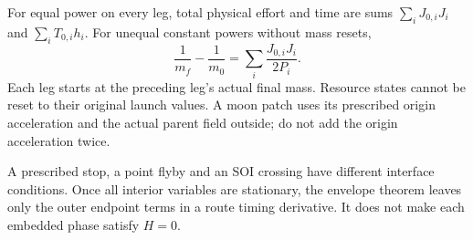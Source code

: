 For equal power on every leg, total physical effort and time are sums
$\sum_i J_{0,i}J_i$ and $\sum_i T_{0,i}h_i$.
For unequal constant powers without mass resets,
\begin{equation}
 \frac1{m_f}-\frac1{m_0}
 =\sum_i\frac{J_{0,i}J_i}{2P_i}.
 \label{eq:route_mass}
\end{equation}
Each leg starts at the preceding leg's actual final mass.
Resource states cannot be reset to their original launch values.
A moon patch uses its prescribed origin acceleration and the actual
parent field outside; do not add the origin acceleration twice.

A prescribed stop, a point flyby and an SOI crossing have different
interface conditions. Once all interior variables are stationary,
the envelope theorem leaves only the outer endpoint terms in a route
timing derivative. It does not make each embedded phase satisfy $H=0$.
